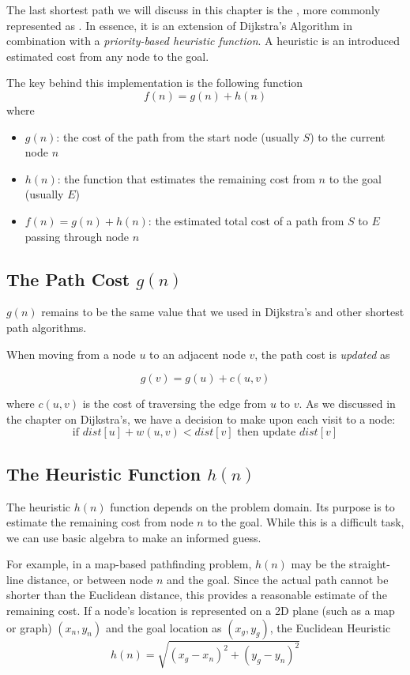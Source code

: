 The last shortest path we will discuss in this chapter is the , more commonly represented as . In essence, it is an extension of Dijkstra's Algorithm in combination with a \emph{priority-based heuristic function}. A heuristic is an introduced estimated cost from any node to the goal.

The key behind this implementation is the following function
\[
	f(n) = g(n) + h(n)
\]
where
\begin{itemize}
	\item $g(n)$: the cost of the path from the start node (usually $S$) to the current node $n$
	\item $h(n)$: the  function that estimates the remaining cost from $n$ to the goal (usually $E$)
	\item $f(n) = g(n) + h(n)$: the estimated total cost of a path from $S$ to $E$ passing through node $n$
\end{itemize}

\subsection{The Path Cost $g(n)$}
$g(n)$ remains to be the same value that we used in Dijkstra's and other shortest path algorithms.

When moving from a node $u$ to an adjacent node $v$, the path cost is \emph{updated} as

\[
	g(v) = g(u) + c(u,v)
\]

where $c(u,v)$ is the cost of traversing the edge from $u$ to $v$. As we discussed in the chapter on Dijkstra's, we have a decision to make upon each visit to a node:
\[
	\text{if }dist[u]+w(u,v)<dist[v]\text{ then update }dist[v]
\]
\subsection{The Heuristic Function $h(n)$}
The heuristic $h(n)$ function depends on the problem domain. Its purpose is to estimate the remaining cost from node $n$ to the goal. While this is a difficult task, we can use basic algebra to make an informed guess.

For example, in a map-based pathfinding problem, $h(n)$ may be the straight-line distance, or  between node $n$ and the goal. Since the actual path cannot be shorter than the Euclidean distance, this provides a reasonable estimate of the remaining cost. If a node's location is represented on a 2D plane (such as a map or graph) $(x_n, y_n)$ and the goal location as $(x_g, y_g)$, the Euclidean Heuristic
$$h(n) = \sqrt{(x_g-x_n)^2 + (y_g-y_n)^2}$$

